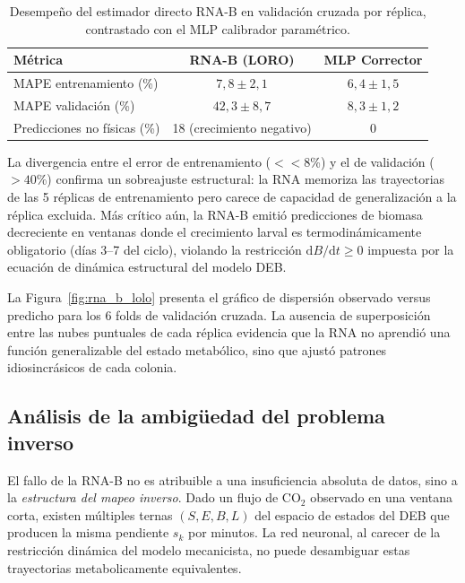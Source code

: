 \begin{table}[htbp]
\centering
\caption{Desempeño del estimador directo RNA-B en validación cruzada por réplica, contrastado con el MLP calibrador paramétrico.}
\label{tab:rna_vs_mlp}
\begin{tabular}{lcc}
\toprule
\textbf{Métrica} & \textbf{RNA-B (LORO)} & \textbf{MLP Corrector} \\
\midrule
MAPE entrenamiento (\%) & $7{,}8 \pm 2{,}1$ & $6{,}4 \pm 1{,}5$ \\
MAPE validación (\%) & $42{,}3 \pm 8{,}7$ & $8{,}3 \pm 1{,}2$ \\
Predicciones no físicas (\%) & 18 (crecimiento negativo) & 0 \\
\bottomrule
\end{tabular}
\end{table}

La divergencia entre el error de entrenamiento ($<<8$\%) y el de validación ($>40$\%) confirma un sobreajuste estructural: la RNA memoriza las trayectorias de las 5 réplicas de entrenamiento pero carece de capacidad de generalización a la réplica excluida. Más crítico aún, la RNA-B emitió predicciones de biomasa decreciente en ventanas donde el crecimiento larval es termodinámicamente obligatorio (días 3--7 del ciclo), violando la restricción $\mathrm{d}B/\mathrm{d}t \geq 0$ impuesta por la ecuación de dinámica estructural del modelo DEB.

La Figura~\ref{fig:rna_b_lolo} presenta el gráfico de dispersión observado versus predicho para los 6 folds de validación cruzada. La ausencia de superposición entre las nubes puntuales de cada réplica evidencia que la RNA no aprendió una función generalizable del estado metabólico, sino que ajustó patrones idiosincrásicos de cada colonia.

\subsection{Análisis de la ambigüedad del problema inverso}
\label{subsec:rna_b_epistemologia}
El fallo de la RNA-B no es atribuible a una insuficiencia absoluta de datos, sino a la \emph{estructura del mapeo inverso}. Dado un flujo de CO$_2$ observado en una ventana corta, existen múltiples ternas $(S, E, B, L)$ del espacio de estados del DEB que producen la misma pendiente $s_k$ por minutos. La red neuronal, al carecer de la restricción dinámica del modelo mecanicista, no puede desambiguar estas trayectorias metabolicamente equivalentes.

